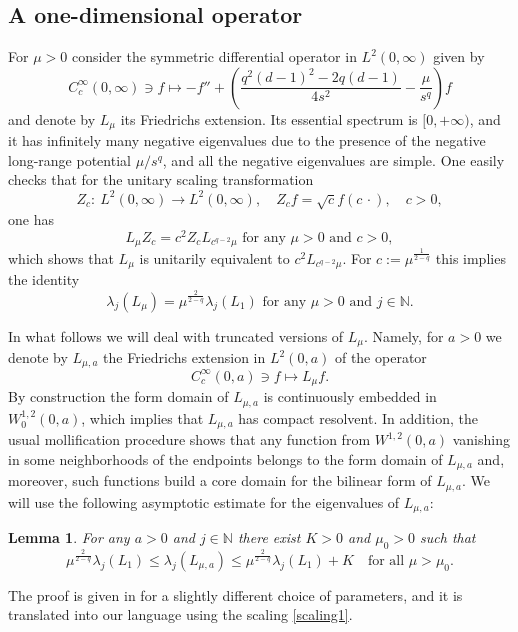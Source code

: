 \documentclass[11pt,oneside,reqno,a4paper]{amsart}
\newcommand{\N}{\mathbb{N}}
\newtheorem{lemma}[theorem]{Lemma}
\theoremstyle{definition}
\begin{document}
	\subsection{A one-dimensional operator}\label{sec1d}
	For  $\mu>0$  consider the symmetric differential operator in $L^2(0,\infty)$ given by
	\begin{equation*}
		C_c^\infty(0,\infty) \ni f \mapsto -f'' + \left(\frac{q^2(d-1)^2-2q(d-1)}{4s^2}-\frac{\mu}{s^q}\right) f
	\end{equation*}
	and denote by $L_{\mu}$ its Friedrichs extension. Its essential spectrum is $[0,+\infty)$, and it has infinitely many negative eigenvalues due to the presence of the negative long-range potential $\mu/s^q$, and all the negative eigenvalues are simple. One easily checks that for the unitary scaling transformation
	\[
	Z_c:\ L^2(0,\infty)\to L^2(0,\infty), \quad Z_c f=\sqrt{c} f(c\,\cdot),\quad c>0,
	\]
	one has
	\begin{equation}
		\label{scaling1}
	L_\mu Z_c=c^2 Z_c L_{c^{q-2}\mu} \text{ for any $\mu>0$ and $c>0$},
	\end{equation}
	which shows that $L_\mu$ is unitarily equivalent to $c^2L_{c^{q-2}\mu}$. For $c:=\mu^{\frac{1}{2-q}}$ this implies the identity
	\begin{equation*}
		\label{scaling2}
	\lambda_j(L_\mu)=\mu^\frac{2}{2-q}\lambda_j(L_1) \text{ for any $\mu>0$ and $j\in\N$.}
	\end{equation*}
	
	In what follows we will deal with truncated versions of $L_{\mu}$. Namely, for $a>0$ we denote by $L_{\mu,a}$ the Friedrichs extension in $L^2(0,a)$ of the operator
	\[
	C_{c}^\infty (0,a)\ni f\mapsto L_{\mu} f.
	\]
	By construction the form domain of $L_{\mu,a}$ is continuously embedded in $W^{1,2}_0(0,a)$, which implies that $L_{\mu,a}$ has compact resolvent. In addition, the usual mollification procedure shows that any function from $W^{1,2}(0,a)$ vanishing in some neighborhoods of the endpoints belongs to the form domain of $L_{\mu,a}$ and, moreover, such functions build a core domain for the bilinear form of $L_{\mu,a}$. We will use the following asymptotic estimate for the eigenvalues of $L_{\mu,a}$:
	\begin{lemma}\label{modelop1}
		For any $a>0$ and $j\in\N$ there exist $K>0$ and $\mu_0>0$ such that
		\[
		\mu^\frac{2}{2-q}\lambda_j(L_1)\le
		\lambda_j(L_{\mu,a})\le \mu^{\frac{2}{2-q}} \lambda_j(L_{1})+K\quad \text{for all }\mu >\mu_0.
		\]
	\end{lemma}
	The proof is given in \cite[Sec.~3.1]{kov} for a slightly different choice of parameters, and it is translated into our language using the scaling \eqref{scaling1}.
	
\end{document}
